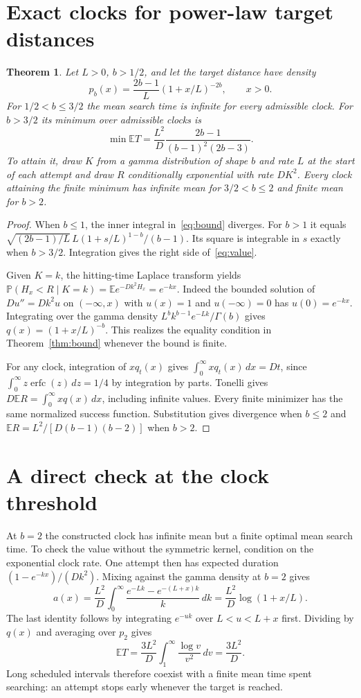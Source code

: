 \documentclass[11pt]{article}
\newtheorem{theorem}{Theorem}
\newcommand{\E}{\mathbb{E}}
\newcommand{\Prob}{\mathbb{P}}
\newcommand{\erfc}{\operatorname{erfc}}
\begin{document}
\section{Exact clocks for power-law target distances}
\begin{theorem}\label{thm:lomax}
Let $L>0$, $b>1/2$, and let the target distance have density
\[
 p_b(x)=\frac{2b-1}{L}(1+x/L)^{-2b},\qquad x>0 .
\]
For $1/2<b\le3/2$ the mean search time is infinite for every admissible
clock. For $b>3/2$ its minimum over admissible clocks is
\begin{equation}\label{eq:value}
 \min \E T=\frac{L^2}{D}\frac{2b-1}{(b-1)^2(2b-3)} .
\end{equation}
To attain it, draw $K$ from a gamma distribution of shape $b$ and rate $L$
at the start of each attempt and draw $R$ conditionally exponential with
rate $DK^2$. Every clock attaining the finite minimum has infinite mean for
$3/2<b\le2$ and finite mean for $b>2$.
\end{theorem}
\begin{proof}
When $b\le1$, the inner integral in~\eqref{eq:bound} diverges. For $b>1$
it equals
$\sqrt{(2b-1)/L}\,L(1+s/L)^{1-b}/(b-1)$.
Its square is integrable in $s$ exactly when $b>3/2$. Integration gives
the right side of~\eqref{eq:value}.

Given $K=k$, the hitting-time Laplace transform yields
$\Prob(H_x<R\mid K=k)=\E e^{-Dk^2 H_x}=e^{-kx}$.
Indeed the bounded solution of $Du''=Dk^2u$ on $(-\infty,x)$ with
$u(x)=1$ and $u(-\infty)=0$ has $u(0)=e^{-kx}$. Integrating over the
gamma density $L^b k^{b-1}e^{-Lk}/\Gamma(b)$ gives
$q(x)=(1+x/L)^{-b}$. This realizes the equality condition in
Theorem~\ref{thm:bound} whenever the bound is finite.

For any clock, integration of $xq_t(x)$ gives
$\int_0^\infty xq_t(x)\,dx=Dt$, since
$\int_0^\infty z\erfc(z)\,dz=1/4$ by integration by parts. Tonelli gives
$D\E R=\int_0^\infty xq(x)\,dx$, including infinite values.
Every finite minimizer has the same normalized success function.
Substitution gives divergence when $b\le2$ and
$\E R=L^2/[D(b-1)(b-2)]$ when $b>2$.
\end{proof}

\section{A direct check at the clock threshold}
At $b=2$ the constructed clock has infinite mean but a finite optimal
mean search time. To check the value without the symmetric kernel, condition
on the exponential clock rate. One attempt then has expected duration
$(1-e^{-kx})/(Dk^2)$. Mixing against the gamma density at $b=2$ gives
\[
 a(x)=\frac{L^2}{D}\int_0^\infty
 \frac{e^{-Lk}-e^{-(L+x)k}}{k}\,dk
 =\frac{L^2}{D}\log(1+x/L).
\]
The last identity follows by integrating $e^{-uk}$ over $L<u<L+x$
first. Dividing by $q(x)$ and averaging over $p_2$ gives
\[
 \E T=\frac{3L^2}{D}\int_1^\infty \frac{\log v}{v^2}\,dv
 =\frac{3L^2}{D}.
\]
Long scheduled intervals therefore coexist with a finite mean time spent
searching: an attempt stops early whenever the target is reached.
\end{document}
